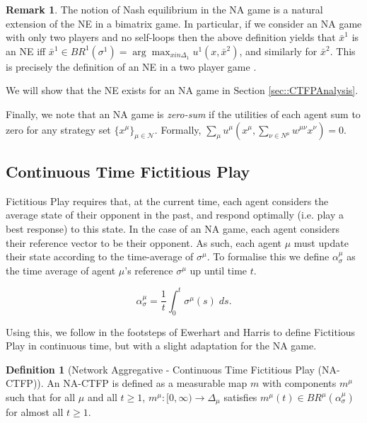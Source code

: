 \documentclass{article}
\theoremstyle{definition}
\newtheorem{definition}{Definition}
\newtheorem*{remark}{Remark}
\newcommand{\agentset}{\mathcal{N}}
\newcommand{\wmunu}{w^{\mu \nu}}
\newcommand{\xmu}{x^{\mu}}
\newcommand{\xnu}{x^{\nu}}
\newcommand{\refmu}{\sigma^{\mu}}
\newcommand{\avgref}[1]{\alpha_\sigma^{#1}}
\newcommand{\NE}[1]{\bar{x}^{#1}}
\newcommand{\weightedsum}{ \sum_{\nu \in N^\mu} \wmunu \xnu}
\begin{document}
\begin{remark}
	The notion of Nash equilibrium in the NA game is a natural
	extension of the NE in a bimatrix game.
	In particular, if we consider an NA game with only two players and no
	self-loops then the above definition yields that $ \NE{1}$ is an NE iff
	$     \NE{1} \in BR^1 (\sigma^1) = \arg \max_{x in \Delta_1} u^1 (x, \NE{2})$,
	and similarly for $\NE{2}$. This is precisely the definition of an NE in a two player game \cite{}.
\end{remark}

We will show that the NE exists for an NA game in Section \ref{sec::CTFPAnalysis}. 

Finally, we note that an NA game is \emph{zero-sum} if the utilities of each agent sum to zero for any strategy set $\{ \xmu \}_{\mu \in \agentset}$. Formally,
%
$\sum_\mu u^\mu(\xmu, \weightedsum) = 0$.

\subsection{Continuous Time Fictitious Play}
\label{sec::CTFP}

  Fictitious Play requires that, at the current time, each agent
  considers the average state of their opponent in the past, and
  respond optimally (i.e. play a best response) to this state. In the
  case of an NA game, each agent considers their reference vector to
  be their opponent. As such, each agent $\mu$ must update their state
  according to the time-average of $\refmu$. To formalise this we
  define $\avgref{\mu}$ as the time average of agent $\mu$'s reference
  $\refmu$ up until time $t$.

  \begin{equation}
    \avgref{\mu} = \frac{1}{t} \int_0^t \refmu(s) \; ds.
  \end{equation}

  Using this, we follow in the footsteps of Ewerhart \cite{Ostrovski2014} and Harris \cite{Harris1998} to define
  Fictitious Play in continuous time, but with a slight adaptation for the NA game.
%
  \begin{definition}[Network Aggregative - Continuous Time Fictitious Play (NA-CTFP)] \label{def::NACTFP}
    An NA-CTFP is defined as a measurable map $m$ with components $m^\mu$ such that for all $\mu$
    and all $t \geq 1$, $m^\mu: [0, \infty) \rightarrow \Delta_\mu$ satisfies $m^\mu(t) \in
    BR^\mu(\alpha_{\sigma}^\mu)$ for almost all $t \geq 1$.
  \end{definition}
\end{document}
